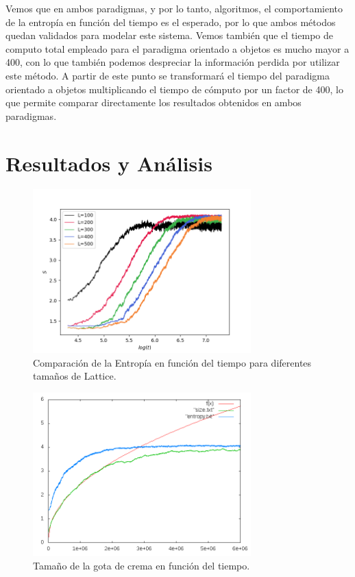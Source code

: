 \documentclass[12pt,twocolumn]{article}
\begin{document}
Vemos que en ambos paradigmas, y por lo tanto, algoritmos, el comportamiento de la entropía 
en función del tiempo es el esperado, por lo que ambos métodos quedan validados para modelar 
este sistema. Vemos también que el tiempo de computo total empleado para el paradigma orientado 
a objetos es mucho mayor a 400, con lo que también podemos despreciar la información perdida 
por utilizar este método. A partir de este punto se transformará el tiempo del paradigma 
orientado a objetos multiplicando el tiempo de cómputo por un factor de 400, lo que permite 
comparar directamente los resultados obtenidos en ambos paradigmas.

\section{Resultados y Análisis}

\begin{figure}
    \centering
    \includegraphics[width=0.75\textwidth]{figs/S_vs_t_sizes.png}
    \caption{Comparación de la Entropía en función del tiempo para diferentes tamaños de Lattice.}
    \label{fig:hole}
\end{figure}

\begin{figure}
    \centering
    \includegraphics[width=0.75\textwidth]{figs/size.png}
    \caption{Tamaño de la gota de crema en función del tiempo.}
    \label{fig:hole}
\end{figure}
\end{document}
